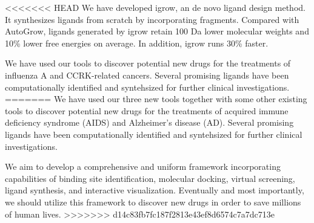 <<<<<<< HEAD
We have developed igrow, an de novo ligand design method. It synthesizes ligands from scratch by incorporating fragments. Compared with AutoGrow, ligands generated by igrow retain 100 Da lower molecular weights and 10\% lower free energies on average. In addition, igrow runs 30\% faster.

We have used our tools to discover potential new drugs for the treatments of influenza A and CCRK-related cancers. Several promising ligands have been computationally identified and syntehsized for further clinical investigations.
=======
We have used our three new tools together with some other existing tools to discover potential new drugs for the treatments of acquired immune deficiency syndrome (AIDS) and Alzheimer's disease (AD). Several promising ligands have been computationally identified and syntehsized for further clinical investigations.

We aim to develop a comprehensive and uniform framework incorporating capabilities of binding site identification, molecular docking, virtual screening, ligand synthesis, and interactive visualization. Eventually and most importantly, we should utilize this framework to discover new drugs in order to save millions of human lives.
>>>>>>> d14c83fb7fc187f2813e43ef8d6574c7a7dc713e
